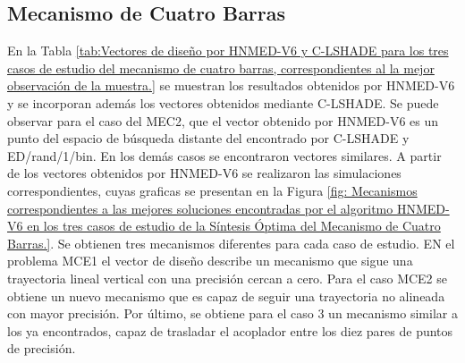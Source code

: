 \subsection{Mecanismo de Cuatro Barras}
En la Tabla \ref{tab:Vectores de diseño por HNMED-V6 y C-LSHADE para los tres casos de estudio del mecanismo de cuatro barras, correspondientes al la mejor observación de la muestra.} se muestran los resultados obtenidos por HNMED-V6 y se incorporan además los vectores obtenidos mediante C-LSHADE. Se puede observar para el caso del MEC2, que el vector obtenido por HNMED-V6 es un punto del espacio de búsqueda distante del encontrado por C-LSHADE y ED/rand/1/bin. En los demás casos se encontraron vectores similares.  A partir de los vectores obtenidos por HNMED-V6 se realizaron las simulaciones correspondientes, cuyas graficas se presentan en la Figura \ref{fig: Mecanismos correspondientes a las mejores soluciones encontradas por el algoritmo HNMED-V6 en los
	tres casos de estudio de la Síntesis Óptima del Mecanismo de Cuatro Barras.}. Se obtienen tres mecanismos diferentes para cada caso de estudio. EN el problema MCE1 el vector de diseño describe un mecanismo que sigue una trayectoria lineal vertical con una precisión cercan a cero.  Para el caso MCE2 se obtiene un nuevo mecanismo que es capaz de seguir una trayectoria no alineada con mayor precisión. Por último,  se obtiene para el caso 3 un mecanismo similar a los ya encontrados, capaz de trasladar el acoplador entre los diez pares de puntos de precisión.


